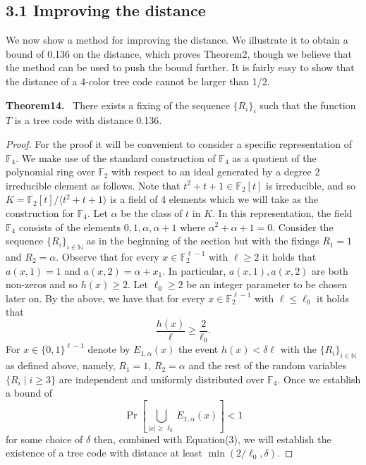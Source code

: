 \documentclass[10pt,a4paper]{article}
\newenvironment{authorclaim}[1]{\par\medskip\noindent\textbf{#1.}\ \ignorespaces}{\par\medskip}
\begin{document}
\subsection*{3.1 Improving the distance}
We now show a method for improving the distance. We illustrate it to obtain a bound of 0.136 on the distance, which proves Theorem2, though we believe that the method can be used to push the bound further. It is fairly easy to show that the distance of a 4-color tree code cannot be larger than 1/2.
\begin{authorclaim}{Theorem14}
There exists a fixing of the sequence $\{R_i\}_i$ such that the function $T$ is a tree code with distance 0.136.
\end{authorclaim}
\begin{proof}
For the proof it will be convenient to consider a specific representation of $\mathbb F_4$. We make use of the standard construction of $\mathbb F_4$ as a quotient of the polynomial ring over $\mathbb F_2$ with respect to an ideal generated by a degree 2 irreducible element as follows. Note that $t^2+t+1\in\mathbb F_2[t]$ is irreducible, and so $K=\mathbb F_2[t]/\langle t^2+t+1\rangle$ is a field of 4 elements which we will take as the construction for $\mathbb F_4$. Let $\alpha$ be the class of $t$ in $K$. In this representation, the field $\mathbb F_4$ consists of the elements $0,1,\alpha,\alpha+1$ where $\alpha^2+\alpha+1=0$.
Consider the sequence $\{R_i\}_{i\in\mathbb N}$ as in the beginning of the section but with the fixings $R_1=1$ and $R_2=\alpha$. Observe that for every $x\in\mathbb F_2^{\ell-1}$ with $\ell\ge2$ it holds that $a(x,1)=1$ and $a(x,2)=\alpha+x_1$. In particular, $a(x,1),a(x,2)$ are both non-zeros and so $h(x)\ge2$. Let $\ell_0\ge2$ be an integer parameter to be chosen later on. By the above, we have that for every $x\in\mathbb F_2^{\ell-1}$ with $\ell\le\ell_0$ it holds that
\begin{equation}
\frac{h(x)}{\ell}\ge\frac2{\ell_0}.\tag{3}
\end{equation}
For $x\in\{0,1\}^{\ell-1}$ denote by $E_{1,\alpha}(x)$ the event $h(x)<\delta\ell$ with the $\{R_i\}_{i\in\mathbb N}$ as defined above, namely, $R_1=1$, $R_2=\alpha$ and the rest of the random variables $\{R_i\mid i\ge3\}$ are independent and uniformly distributed over $\mathbb F_4$. Once we establish a bound of
\begin{equation}
\Pr[\bigcup_{|x|\ge\ell_0}E_{1,\alpha}(x)]<1\tag{4}
\end{equation}
for some choice of $\delta$ then, combined with Equation(3), we will establish the existence of a tree code with distance at least $\min(2/\ell_0,\delta)$.

\end{proof}
\end{document}
